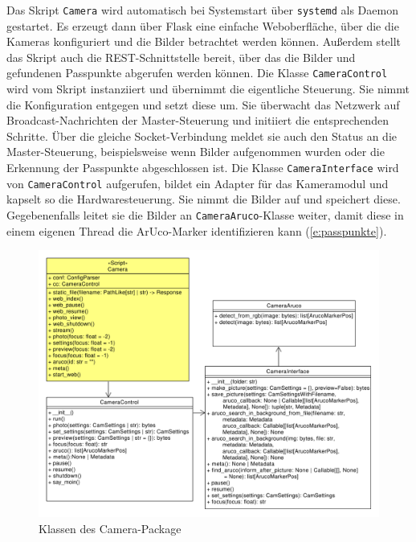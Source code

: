 \documentclass[./00PhotoBox.tex]{subfiles}
\begin{document}
Das Skript \texttt{Camera} wird automatisch bei Systemstart über \texttt{systemd} als Daemon gestartet. Es erzeugt dann über Flask eine einfache Weboberfläche, über die die Kameras konfiguriert und die Bilder betrachtet werden können. Außerdem stellt das Skript auch die REST-Schnittstelle bereit, über das die Bilder und gefundenen Passpunkte abgerufen werden können. Die Klasse \texttt{CameraControl} wird vom Skript instanziiert und übernimmt die eigentliche Steuerung. Sie nimmt die Konfiguration entgegen und setzt diese um. Sie überwacht das Netzwerk auf Broadcast-Nachrichten der Master-Steuerung und initiiert die entsprechenden Schritte.  Über die gleiche Socket-Verbindung meldet sie auch den Status an die Master-Steuerung, beispielsweise wenn Bilder aufgenommen wurden oder die Erkennung der Passpunkte abgeschlossen ist. Die Klasse \texttt{CameraInterface} wird von \texttt{CameraControl} aufgerufen, bildet ein Adapter für das Kameramodul und kapselt so die Hardwaresteuerung. Sie nimmt die Bilder auf und speichert diese. Gegebenenfalls leitet sie die Bilder an \texttt{CameraAruco}-Klasse weiter, damit diese in einem eigenen Thread die ArUco-Marker identifizieren kann (\autoref{e:passpunkte}).

\begin{figure}
  \centering
  \includegraphics[width=1\textwidth]{./img/uml/uml_camera_classdiagramm.pdf}
  \caption{Klassen des Camera-Package} %
  \label{img:uml_camera} %
\end{figure}
\end{document}
